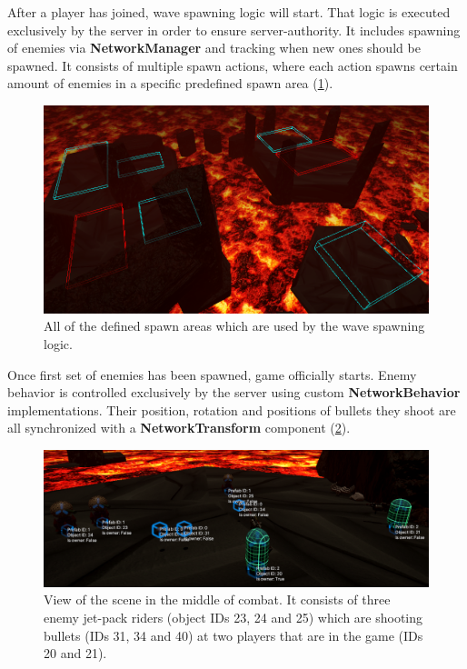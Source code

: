 \documentclass[times, utf8, diplomski]{fer}
\begin{document}
After a player has joined, wave spawning logic will start. That logic is executed exclusively by the server in order to ensure server-authority. It includes spawning of enemies via \textbf{NetworkManager} and tracking when new ones should be spawned. It consists of multiple spawn actions, where each action spawns certain amount of enemies in a specific predefined spawn area (\ref{fig:game-spawn-areas}).\\

\begin{figure}[H]
	\centering
	\includegraphics[scale=0.58]{Game-spawn-areas}
	\caption{All of the defined spawn areas which are used by the wave spawning logic.}
	\label{fig:game-spawn-areas}
\end{figure}

Once first set of enemies has been spawned, game officially starts. Enemy behavior is controlled exclusively by the server using custom \textbf{NetworkBehavior} implementations. Their position, rotation and positions of bullets they shoot are all synchronized with a \textbf{NetworkTransform} component (\ref{fig:game-enemies-networked}).\\

\begin{figure}[H]
	\centering
	\includegraphics[scale=0.5]{Game-enemies-networked}
	\caption{View of the scene in the middle of combat. It consists of three enemy jet-pack riders (object IDs 23, 24 and 25) which are shooting bullets (IDs 31, 34 and 40) at two players that are in the game (IDs 20 and 21).}
	\label{fig:game-enemies-networked}
\end{figure}
\end{document}
